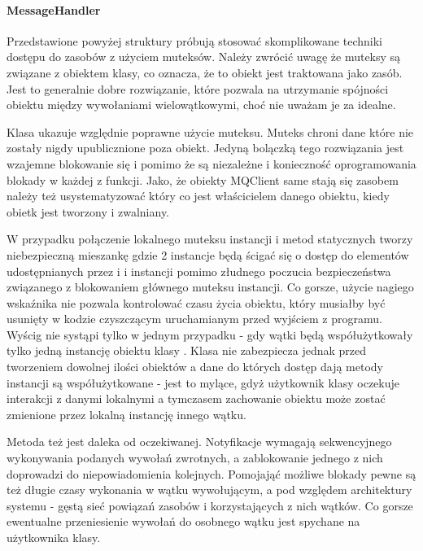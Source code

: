 \paragraph{MessageHandler}
Przedstawione powyżej struktury próbują stosować skomplikowane techniki dostępu do zasobów z użyciem muteksów. Należy zwrócić uwagę że muteksy są związane z obiektem klasy, co oznacza, że to obiekt jest traktowana jako zasób. Jest to generalnie dobre rozwiązanie, które pozwala na utrzymanie spójności obiektu między wywołaniami wielowątkowymi, choć nie uważam je za idealne.

Klasa  ukazuje względnie poprawne użycie muteksu. Muteks chroni dane które nie zostały nigdy upublicznione poza obiekt. Jedyną bolączką tego rozwiązania jest wzajemne blokowanie się  i  pomimo że są niezależne i konieczność oprogramowania blokady w każdej z funkcji. Jako, że obiekty MQClient same stają się zasobem należy też usystematyzować który co jest właścicielem danego obiektu, kiedy obietk jest tworzony i zwalniany.

W przypadku  połączenie lokalnego muteksu instancji i metod statycznych tworzy niebezpieczną mieszankę gdzie 2 instancje będą ścigać się o dostęp do elementów udostępnianych przez  i  i instancji  pomimo złudnego poczucia bezpieczeństwa związanego z blokowaniem głównego muteksu instancji. Co gorsze, użycie nagiego wskaźnika  nie pozwala kontrolować czasu życia obiektu, który musiałby być usunięty w kodzie czyszczącym uruchamianym przed wyjściem z programu. Wyścig nie systąpi tylko w jednym przypadku - gdy wątki będą współużytkowały tylko jedną instancję obiektu klasy . Klasa nie zabezpiecza jednak przed tworzeniem dowolnej ilości obiektów a dane do których dostęp dają metody instancji są współużytkowane - jest to mylące, gdyż użytkownik klasy oczekuje interakcji z danymi lokalnymi a tymczasem zachowanie obiektu może zostać zmienione przez lokalną instancję  innego wątku.

Metoda  też jest daleka od oczekiwanej. Notyfikacje wymagają sekwencyjnego wykonywania podanych wywołań zwrotnych, a zablokowanie jednego z nich doprowadzi do niepowiadomienia kolejnych. Pomojająć możliwe blokady pewne są też długie czasy wykonania w wątku wywołującym, a pod względem architektury systemu - gęstą sieć powiązań zasobów i korzystających z nich wątków. Co gorsze ewentualne przeniesienie wywołań do osobnego wątku jest spychane na użytkownika klasy.

